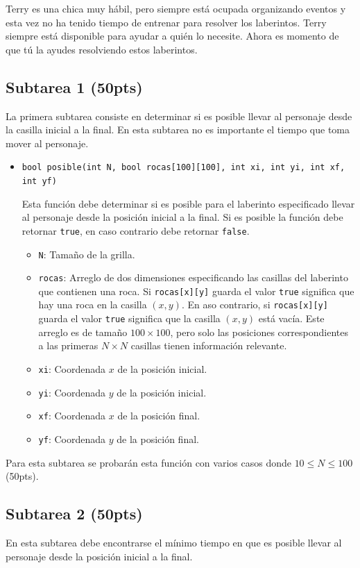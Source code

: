 \documentclass{oci}
\begin{document}
Terry es una chica muy hábil, pero siempre está ocupada organizando eventos y esta vez no ha tenido tiempo de entrenar para resolver los laberintos.
Terry siempre está disponible para ayudar a quién lo necesite.
Ahora es momento de que tú la ayudes resolviendo estos laberintos.

\subsection*{Subtarea 1 (50pts)}
La primera subtarea consiste en determinar si es posible llevar al personaje desde la casilla inicial a la final.
En esta subtarea no es importante el tiempo que toma mover al personaje.

\begin{itemize}
	\item \verb+bool posible(int N, bool rocas[100][100], int xi, int yi, int xf, int yf)+

Esta función debe determinar si es posible para el laberinto especificado llevar al personaje desde la posición inicial a la final.
  Si es posible la función debe retornar \texttt{true}, en caso contrario debe retornar \texttt{false}.
  \begin{itemize}
    \item \verb+N+: Tamaño de la grilla.
    \item \verb+rocas+: Arreglo de dos dimensiones especificando las casillas del laberinto que contienen una roca.
      Si \verb+rocas[x][y]+ guarda el valor \verb+true+ significa que hay una roca en la casilla $(x,y)$.
      En aso contrario, si \verb+rocas[x][y]+ guarda el valor \verb+true+ significa que la casilla $(x,y)$ está vacía.
      Este arreglo es de tamaño $100\times 100$, pero solo las posiciones correspondientes a las primeras $N\times N$ casillas tienen información relevante.
    \item \verb+xi+: Coordenada $x$ de la posición inicial.
    \item \verb+yi+: Coordenada $y$ de la posición inicial.
    \item \verb+xf+: Coordenada $x$ de la posición final.
    \item \verb+yf+: Coordenada $y$ de la posición final.
  \end{itemize}
\end{itemize}

Para esta subtarea se probarán esta función con varios casos donde $10 \leq N\leq 100$ (50pts).

\subsection*{Subtarea 2 (50pts)}
En esta subtarea debe encontrarse el mínimo tiempo en que es posible llevar al personaje desde la posición inicial a la final.
\end{document}
